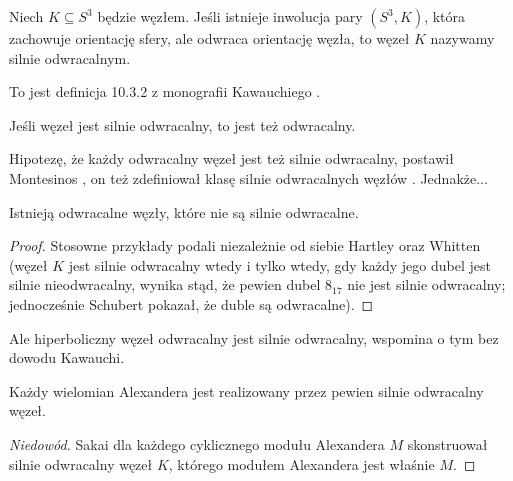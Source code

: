 \begin{definition}
    Niech $K \subseteq S^3$ będzie węzłem.
    Jeśli istnieje inwolucja pary $(S^3, K)$, która zachowuje orientację sfery, ale odwraca orientację węzła, to węzeł $K$ nazywamy silnie odwracalnym.
\end{definition}

To jest definicja 10.3.2 z monografii Kawauchiego \cite{kawauchi1996}.

\begin{proposition}
    Jeśli węzeł jest silnie odwracalny, to jest też odwracalny.
\end{proposition}

Hipotezę, że każdy odwracalny węzeł jest też silnie odwracalny, postawił Montesinos \cite[problem 1.6]{kirby1978}, on też zdefiniował klasę silnie odwracalnych węzłów \cite{montesinos1975}.
%
Jednakże...

\begin{proposition}
    Istnieją odwracalne węzły, które nie są silnie odwracalne.
\end{proposition}

\begin{proof}
%
%
    Stosowne przykłady podali niezależnie od siebie Hartley \cite[s. 183]{hartley1980} oraz Whitten \cite{whitten1981} (węzeł $K$ jest silnie odwracalny wtedy i tylko wtedy, gdy każdy jego dubel jest silnie nieodwracalny, wynika stąd, że pewien dubel $8_{17}$ nie jest silnie odwracalny; jednocześnie Schubert \cite[s. 235]{schubert1953} pokazał, że duble są odwracalne).
\end{proof}

Ale hiperboliczny węzeł odwracalny jest silnie odwracalny, wspomina o tym bez dowodu Kawauchi.

\begin{proposition}
    Każdy wielomian Alexandera jest realizowany przez pewien silnie odwracalny węzeł.
\end{proposition}

\begin{proof}[Niedowód]
%
    Sakai \cite{sakai1983} dla każdego cyklicznego modułu Alexandera $M$ skonstruował silnie odwracalny węzeł $K$, którego modułem Alexandera jest właśnie $M$.
\end{proof}


